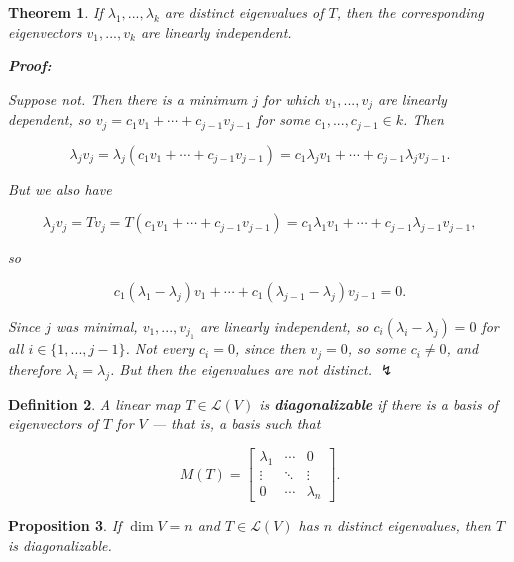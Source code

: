 \documentclass{article}
\theoremstyle{colontheorem}
\newtheorem{theorem}{Theorem}[section]
\newtheorem{proposition}[theorem]{Proposition}
\newtheorem{definition}[theorem]{Definition}
\newenvironment{Theorem}
{
	\begin{mdframed}[backgroundcolor=TheoremOrange!10]
	\begin{theorem}
}
{
	\end{theorem}
	\end{mdframed}
	
	\vspace{.15in}
}
\newenvironment{Proposition}
{
	\begin{mdframed}[backgroundcolor=TheoremOrange!10]
	\begin{proposition}
}
{
	\end{proposition}
	\end{mdframed}
	
	\vspace{.15in}
}
\newenvironment{Def}
{
	\begin{mdframed}[backgroundcolor=DefGreen!10]
	\begin{definition}
}
{
	\end{definition}
	\end{mdframed}
	
	\vspace{.15in}
}
\newenvironment{Proof}
{
	\begin{mdframed}[backgroundcolor=ProofPurple!10]
	\textbf{Proof:}%
}
{
	\end{mdframed}
	
	\vspace{.085in}
}
\begin{document}
\begin{Theorem}
	
	If $\lambda_1, ..., \lambda_k$ are distinct eigenvalues of $T$, then the corresponding eigenvectors $v_1, ..., v_k$ are linearly independent.
	
	\begin{Proof}
		Suppose not. Then there is a minimum $j$ for which $v_1, ..., v_j$ are linearly dependent, so $v_j = c_1 v_1 + \cdots + c_{j-1} v_{j-1}$ for some $c_1, ..., c_{j-1} \in k$. Then
		
		$$
		\lambda_j v_j = \lambda_j (c_1 v_1 + \cdots + c_{j-1} v_{j-1}) = c_1 \lambda_j v_1 + \cdots + c_{j-1} \lambda_j v_{j-1}.
		$$
		
		But we also have
		
		$$
		\lambda_j v_j = Tv_j = T(c_1 v_1 + \cdots + c_{j-1} v_{j-1}) = c_1 \lambda_1 v_1 + \cdots + c_{j-1} \lambda_{j-1} v_{j-1},
		$$
		
		so
		
		$$
		c_1(\lambda_1 - \lambda_j)v_1 + \cdots + c_1(\lambda_{j-1} - \lambda_j)v_{j-1} = 0.
		$$
		
		Since $j$ was minimal, $v_1, ..., v_{j_1}$ are linearly independent, so $c_i(\lambda_i - \lambda_j) = 0$ for all $i \in \{1, ..., j-1\}$. Not every $c_i = 0$, since then $v_j = 0$, so some $c_i \neq 0$, and therefore $\lambda_i = \lambda_j$. But then the eigenvalues are not distinct. $\lightning$
		
	\end{Proof}
	
\end{Theorem}



\begin{Def}
	
	A linear map $T \in \mathcal{L}(V)$ is \textbf{diagonalizable} if there is a basis of eigenvectors of $T$ for $V$ --- that is, a basis such that
	
	$$
	M(T) = \begin{bmatrix}
		\lambda_1 & \cdots & 0\\
		\vdots & \ddots & \vdots\\
		0 & \cdots & \lambda_n
	\end{bmatrix}.
	$$
	
\end{Def}



\begin{Proposition}
	
	If $\dim V = n$ and $T \in \mathcal{L}(V)$ has $n$ distinct eigenvalues, then $T$ is diagonalizable.
	
\end{Proposition}
\end{document}
